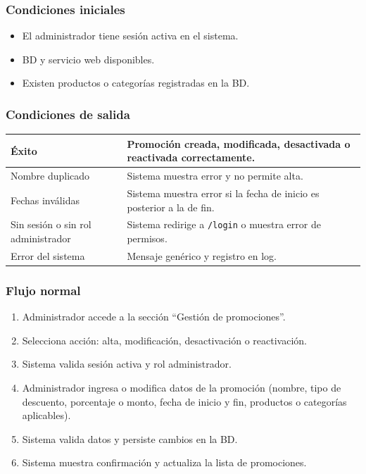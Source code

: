 \documentclass[12pt,a4paper]{article}
\begin{document}
\subsubsection*{Condiciones iniciales}
\begin{itemize}[label=--]
    \item El administrador tiene sesión activa en el sistema.
    \item BD y servicio web disponibles.
    \item Existen productos o categorías registradas en la BD.
\end{itemize}

\subsubsection*{Condiciones de salida}
\begin{longtable}{|l|p{10cm}|}
    \hline
    Éxito                              & Promoción creada, modificada, desactivada o reactivada correctamente. \\ \hline
    Nombre duplicado                   & Sistema muestra error y no permite alta.                              \\ \hline
    Fechas inválidas                   & Sistema muestra error si la fecha de inicio es posterior a la de fin. \\ \hline
    Sin sesión o sin rol administrador & Sistema redirige a \texttt{/login} o muestra error de permisos.       \\ \hline
    Error del sistema                  & Mensaje genérico y registro en log.                                   \\ \hline
\end{longtable}

\subsubsection*{Flujo normal}
\begin{enumerate}[label=FN-\arabic*]
    \item Administrador accede a la sección “Gestión de promociones”.
    \item Selecciona acción: alta, modificación, desactivación o reactivación.
    \item Sistema valida sesión activa y rol administrador.
    \item Administrador ingresa o modifica datos de la promoción (nombre, tipo de descuento, porcentaje o monto, fecha de inicio y fin, productos o categorías aplicables).
    \item Sistema valida datos y persiste cambios en la BD.
    \item Sistema muestra confirmación y actualiza la lista de promociones.
\end{enumerate}
\end{document}
